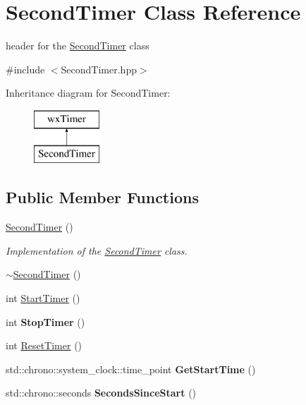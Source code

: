 \hypertarget{class_second_timer}{}\section{Second\+Timer Class Reference}
\label{class_second_timer}


header for the \hyperlink{class_second_timer}{Second\+Timer} class  




{\ttfamily \#include $<$Second\+Timer.\+hpp$>$}

Inheritance diagram for Second\+Timer\+:\begin{figure}[H]
\begin{center}
\leavevmode
\includegraphics[height=2.000000cm]{class_second_timer}
\end{center}
\end{figure}
\subsection*{Public Member Functions}
\begin{DoxyCompactItemize}
\item 
\hyperlink{class_second_timer_ac9fadd2cf50106982c642b8142d99252}{Second\+Timer} ()
\begin{DoxyCompactList}\small\item\em Implementation of the \hyperlink{class_second_timer}{Second\+Timer} class. \end{DoxyCompactList}\item 
\hyperlink{class_second_timer_a1502fddbf09df489c7fa2e0a0e38e7cd}{$\sim$\+Second\+Timer} ()
\item 
int \hyperlink{class_second_timer_aaf1b62f5484b58c312756aa892387e63}{Start\+Timer} ()
\item 
\mbox{\label{class_second_timer_a7d74a8e103bc219566beb0cd32aa9306}} 
int {\bfseries Stop\+Timer} ()
\item 
int \hyperlink{class_second_timer_aa49709158917df78694a64fbbbf39c24}{Reset\+Timer} ()
\item 
\mbox{\label{class_second_timer_a6a3221e6479e97eee4f3f4b09c3c17f8}} 
std\+::chrono\+::system\+\_\+clock\+::time\+\_\+point {\bfseries Get\+Start\+Time} ()
\item 
\mbox{\label{class_second_timer_a905028b4987556c93d5828293afd4f1e}} 
std\+::chrono\+::seconds {\bfseries Seconds\+Since\+Start} ()
\end{DoxyCompactItemize}
